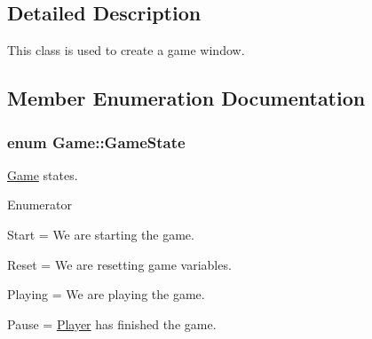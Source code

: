 \subsection{Detailed Description}
This class is used to create a game window. 

\subsection{Member Enumeration Documentation}
\subsubsection[{\texorpdfstring{Game\+State}{GameState}}]{\setlength{\rightskip}{0pt plus 5cm}enum {\bf Game\+::\+Game\+State}\hspace{0.3cm}{\ttfamily [private]}}\hypertarget{class_game_a7f57a7a8408e554d0a72882c287e1d04}{}\label{class_game_a7f57a7a8408e554d0a72882c287e1d04}
\hyperlink{class_game}{Game} states. \begin{Desc}
\item[Enumerator]\par
\begin{description}
\item[{\em 
Start\hypertarget{class_game_a7f57a7a8408e554d0a72882c287e1d04afa4424e746d7d1082d6e27c4811f3984}{}\label{class_game_a7f57a7a8408e554d0a72882c287e1d04afa4424e746d7d1082d6e27c4811f3984}
}]Start = We are starting the game. \item[{\em 
Reset\hypertarget{class_game_a7f57a7a8408e554d0a72882c287e1d04afc89c8495fe7b84c06560b6aa6195bbf}{}\label{class_game_a7f57a7a8408e554d0a72882c287e1d04afc89c8495fe7b84c06560b6aa6195bbf}
}]Reset = We are resetting game variables. \item[{\em 
Playing\hypertarget{class_game_a7f57a7a8408e554d0a72882c287e1d04ac5a0d20c5cb7b20c0f6cca50edeed64f}{}\label{class_game_a7f57a7a8408e554d0a72882c287e1d04ac5a0d20c5cb7b20c0f6cca50edeed64f}
}]Playing = We are playing the game. \item[{\em 
Pause\hypertarget{class_game_a7f57a7a8408e554d0a72882c287e1d04ab2cf7098808338abae856bf46ac82b91}{}\label{class_game_a7f57a7a8408e554d0a72882c287e1d04ab2cf7098808338abae856bf46ac82b91}
}]Pause = \hyperlink{class_player}{Player} has finished the game. \end{description}
\end{Desc}


